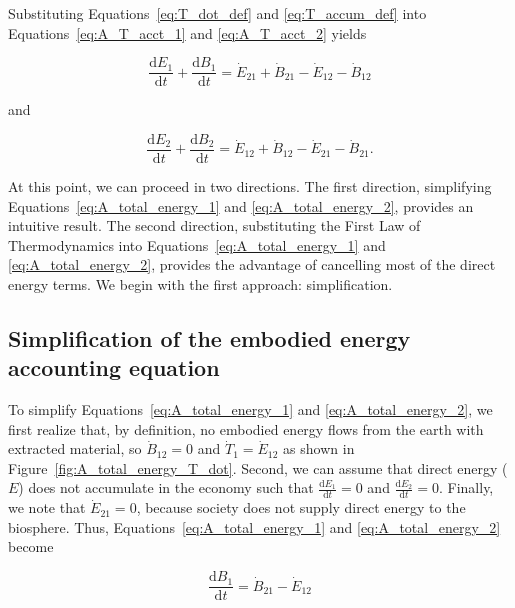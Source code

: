 Substituting Equations~\ref{eq:T_dot_def} and
\ref{eq:T_accum_def} into 
Equations~\ref{eq:A_T_acct_1} and \ref{eq:A_T_acct_2}
yields

\begin{equation} \label{eq:A_total_energy_1}
	\frac{\mathrm{d}E_{1}}{\mathrm{d}t} 
	+ \frac{\mathrm{d}B_{1}}{\mathrm{d}t} 
	= \dot{E}_{21} 
	+ \dot{B}_{21} 
	- \dot{E}_{12}
	- \dot{B}_{12}
\end{equation}

\noindent and

\begin{equation} \label{eq:A_total_energy_2}
	\frac{\mathrm{d}E_{2}}{\mathrm{d}t} 
	+ \frac{\mathrm{d}B_{2}}{\mathrm{d}t} 
	= \dot{E}_{12} 
	+ \dot{B}_{12} 
	- \dot{E}_{21}
	- \dot{B}_{21}.	
\end{equation}

At this point, we can proceed in two directions.
The first direction, 
simplifying Equations~\ref{eq:A_total_energy_1} and \ref{eq:A_total_energy_2}, 
provides an intuitive result. 
The second direction,
substituting the First Law of Thermodynamics into 
Equations~\ref{eq:A_total_energy_1} and \ref{eq:A_total_energy_2}, 
provides the advantage of cancelling most of the direct energy terms.
We begin with the first approach: simplification.


\subsection{Simplification of the embodied energy accounting equation} %
\label{sec:A_simplified_embodied}

To simplify Equations~\ref{eq:A_total_energy_1} and \ref{eq:A_total_energy_2},
we first realize that, by definition, no embodied energy flows from 
the earth with extracted material, so $\dot{B}_{12} = 0$
and $\dot{T}_{1} = \dot{E}_{12}$ as shown in Figure~\ref{fig:A_total_energy_T_dot}.
Second, we can assume that direct energy ($E$) does not accumulate
in the economy such that 
$\frac{\mathrm{d}E_1}{\mathrm{d}t} = 0$ and
$\frac{\mathrm{d}E_2}{\mathrm{d}t} = 0$.
Finally, we note that $\dot{E}_{21} = 0$, 
because society does not supply direct energy 
to the biosphere. Thus, Equations~\ref{eq:A_total_energy_1}
and \ref{eq:A_total_energy_2} become

\begin{equation} \label{eq:A_total_energy_1_simp}
	\frac{\mathrm{d}B_{1}}{\mathrm{d}t} 
	= \dot{B}_{21} 
	- \dot{E}_{12}
\end{equation}

